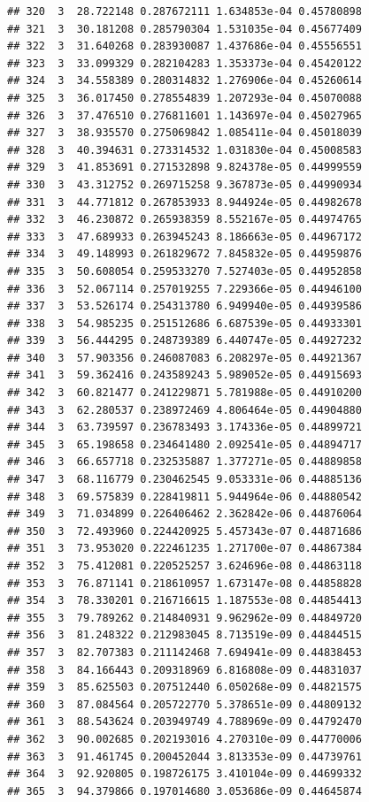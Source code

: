 \documentclass[article]{jss}\usepackage[]{graphicx}\usepackage[]{xcolor}
\makeatletter
\newenvironment{kframe}{%
 \def\at@end@of@kframe{}%
 \ifinner\ifhmode%
  \def\at@end@of@kframe{\end{minipage}}%
  \begin{minipage}{\columnwidth}%
 \fi\fi%
 \def\FrameCommand##1{\hskip\@totalleftmargin \hskip-\fboxsep
 \colorbox{shadecolor}{##1}\hskip-\fboxsep
     \hskip-\linewidth \hskip-\@totalleftmargin \hskip\columnwidth}%
 \MakeFramed {\advance\hsize-\width
   \@totalleftmargin\z@ \linewidth\hsize
   \@setminipage}}%
 {\par\unskip\endMakeFramed%
 \at@end@of@kframe}
\newenvironment{knitrout}{}{} %
\makeatother
\begin{document}
\begin{knitrout}
\begin{kframe}
\begin{verbatim}
## 320  3  28.722148 0.287672111 1.634853e-04 0.45780898
## 321  3  30.181208 0.285790304 1.531035e-04 0.45677409
## 322  3  31.640268 0.283930087 1.437686e-04 0.45556551
## 323  3  33.099329 0.282104283 1.353373e-04 0.45420122
## 324  3  34.558389 0.280314832 1.276906e-04 0.45260614
## 325  3  36.017450 0.278554839 1.207293e-04 0.45070088
## 326  3  37.476510 0.276811601 1.143697e-04 0.45027965
## 327  3  38.935570 0.275069842 1.085411e-04 0.45018039
## 328  3  40.394631 0.273314532 1.031830e-04 0.45008583
## 329  3  41.853691 0.271532898 9.824378e-05 0.44999559
## 330  3  43.312752 0.269715258 9.367873e-05 0.44990934
## 331  3  44.771812 0.267853933 8.944924e-05 0.44982678
## 332  3  46.230872 0.265938359 8.552167e-05 0.44974765
## 333  3  47.689933 0.263945243 8.186663e-05 0.44967172
## 334  3  49.148993 0.261829672 7.845832e-05 0.44959876
## 335  3  50.608054 0.259533270 7.527403e-05 0.44952858
## 336  3  52.067114 0.257019255 7.229366e-05 0.44946100
## 337  3  53.526174 0.254313780 6.949940e-05 0.44939586
## 338  3  54.985235 0.251512686 6.687539e-05 0.44933301
## 339  3  56.444295 0.248739389 6.440747e-05 0.44927232
## 340  3  57.903356 0.246087083 6.208297e-05 0.44921367
## 341  3  59.362416 0.243589243 5.989052e-05 0.44915693
## 342  3  60.821477 0.241229871 5.781988e-05 0.44910200
## 343  3  62.280537 0.238972469 4.806464e-05 0.44904880
## 344  3  63.739597 0.236783493 3.174336e-05 0.44899721
## 345  3  65.198658 0.234641480 2.092541e-05 0.44894717
## 346  3  66.657718 0.232535887 1.377271e-05 0.44889858
## 347  3  68.116779 0.230462545 9.053331e-06 0.44885136
## 348  3  69.575839 0.228419811 5.944964e-06 0.44880542
## 349  3  71.034899 0.226406462 2.362842e-06 0.44876064
## 350  3  72.493960 0.224420925 5.457343e-07 0.44871686
## 351  3  73.953020 0.222461235 1.271700e-07 0.44867384
## 352  3  75.412081 0.220525257 3.624696e-08 0.44863118
## 353  3  76.871141 0.218610957 1.673147e-08 0.44858828
## 354  3  78.330201 0.216716615 1.187553e-08 0.44854413
## 355  3  79.789262 0.214840931 9.962962e-09 0.44849720
## 356  3  81.248322 0.212983045 8.713519e-09 0.44844515
## 357  3  82.707383 0.211142468 7.694941e-09 0.44838453
## 358  3  84.166443 0.209318969 6.816808e-09 0.44831037
## 359  3  85.625503 0.207512440 6.050268e-09 0.44821575
## 360  3  87.084564 0.205722770 5.378651e-09 0.44809132
## 361  3  88.543624 0.203949749 4.788969e-09 0.44792470
## 362  3  90.002685 0.202193016 4.270310e-09 0.44770006
## 363  3  91.461745 0.200452044 3.813353e-09 0.44739761
## 364  3  92.920805 0.198726175 3.410104e-09 0.44699332
## 365  3  94.379866 0.197014680 3.053686e-09 0.44645874

\end{verbatim}
\end{kframe}
\end{knitrout}
\end{document}

